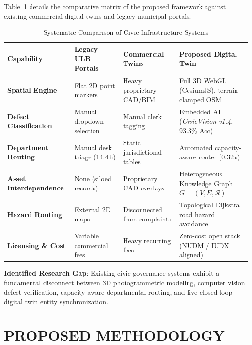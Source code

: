 \documentclass[12pt,a4paper]{report}
\begin{document}
Table~\ref{tab:comparison} details the comparative matrix of the proposed framework against existing commercial digital twins and legacy municipal portals.

\begin{table}[h]
\centering
\caption{Systematic Comparison of Civic Infrastructure Systems}
\label{tab:comparison}
\fontsize{9pt}{12pt}\selectfont
\begin{tabularx}{\textwidth}{|p{3.2cm}|X|X|X|}
\hline
\textbf{Capability} & \textbf{Legacy ULB Portals} & \textbf{Commercial Twins} & \textbf{Proposed Digital Twin} \\
\hline
\textbf{Spatial Engine} & Flat 2D point markers & Heavy proprietary CAD/BIM & Full 3D WebGL (CesiumJS), terrain-clamped OSM \\
\hline
\textbf{Defect Classification} & Manual dropdown selection & Manual clerk tagging & Embedded AI (\textit{CivicVision-v1.4}, 93.3\% Acc) \\
\hline
\textbf{Department Routing} & Manual desk triage (14.4\,h) & Static jurisdictional tables & Automated capacity-aware router (0.32\,s) \\
\hline
\textbf{Asset Interdependence} & None (siloed records) & Proprietary CAD overlays & Heterogeneous Knowledge Graph $G=(V,E,\mathcal{R})$ \\
\hline
\textbf{Hazard Routing} & External 2D maps & Disconnected from complaints & Topological Dijkstra road hazard avoidance \\
\hline
\textbf{Licensing \& Cost} & Variable commercial fees & Heavy recurring fees & Zero-cost open stack (NUDM / IUDX aligned) \\
\hline
\end{tabularx}
\end{table}

\noindent \textbf{Identified Research Gap}: Existing civic governance systems exhibit a fundamental disconnect between 3D photogrammetric modeling, computer vision defect verification, capacity-aware departmental routing, and live closed-loop digital twin entity synchronization.

\newpage
\chapter{PROPOSED METHODOLOGY}
\end{document}
